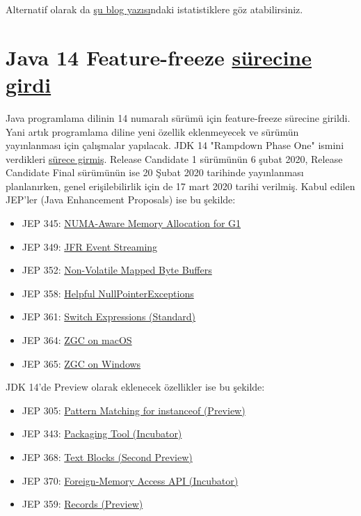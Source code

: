 \documentclass[11pt]{article}
\begin{document}
Alternatif olarak da \href{https://levelup.gitconnected.com/a-recap-of-frontend-development-in-2019-1e7d07966d6c}{şu blog yazısı}ndaki istatistiklere göz atabilirsiniz.
\section{Java 14 Feature-freeze \href{https://www.infoq.com/news/2019/12/java14-feature-freeze/}{sürecine girdi}}
\label{sec:org9508cf1}
Java programlama dilinin 14 numaralı sürümü için feature-freeze sürecine
girildi. Yani artık programlama diline yeni özellik eklenmeyecek ve sürümün
yayınlanması için çalışmalar yapılacak. JDK 14 "Rampdown Phase One" ismini
verdikleri \href{https://openjdk.java.net/projects/jdk/14/}{sürece girmiş}. Release Candidate 1 sürümünün 6 şubat 2020, Release
Candidate Final sürümünün ise 20 Şubat 2020 tarihinde yayınlanması
planlanırken, genel erişilebilirlik için de 17 mart 2020 tarihi verilmiş. Kabul
edilen JEP'ler (Java Enhancement Proposals) ise bu şekilde:

\begin{itemize}
\item JEP 345: \href{https://openjdk.java.net/jeps/345}{NUMA-Aware Memory Allocation for G1}
\item JEP 349: \href{https://openjdk.java.net/jeps/349}{JFR Event Streaming}
\item JEP 352: \href{https://openjdk.java.net/jeps/352}{Non-Volatile Mapped Byte Buffers}
\item JEP 358: \href{https://openjdk.java.net/jeps/358}{Helpful NullPointerExceptions}
\item JEP 361: \href{https://openjdk.java.net/jeps/361}{Switch Expressions (Standard)}
\item JEP 364: \href{https://openjdk.java.net/jeps/364}{ZGC on macOS}
\item JEP 365: \href{https://openjdk.java.net/jeps/365}{ZGC on Windows}
\end{itemize}

JDK 14'de Preview olarak eklenecek özellikler ise bu şekilde:
\begin{itemize}
\item JEP 305: \href{https://openjdk.java.net/jeps/305}{Pattern Matching for instanceof (Preview)}
\item JEP 343: \href{https://openjdk.java.net/jeps/343}{Packaging Tool (Incubator)}
\item JEP 368: \href{https://openjdk.java.net/jeps/368}{Text Blocks (Second Preview)}
\item JEP 370: \href{https://openjdk.java.net/jeps/370}{Foreign-Memory Access API (Incubator)}
\item JEP 359: \href{https://openjdk.java.net/jeps/359}{Records (Preview)}
\end{itemize}
\end{document}
